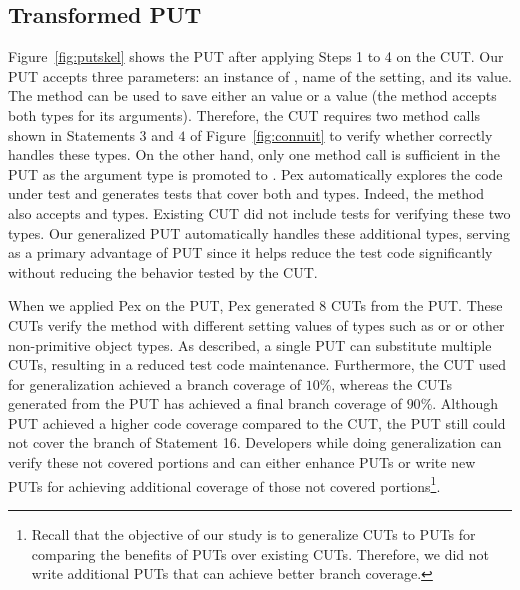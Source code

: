 \subsection{Transformed PUT}

Figure~\ref{fig:putskel} shows the PUT after applying Steps 1 to 4 on the CUT. Our PUT accepts three parameters: an instance of , name of the setting, and its value. The  method can be used to save either an  value or a  value (the method accepts both types for its arguments). Therefore, the CUT requires two method calls shown in Statements $3$ and $4$ of Figure~\ref{fig:connuit} to verify whether  correctly handles these types. On the other hand, only one method call is sufficient in the PUT as the argument type is promoted to . Pex automatically explores the code under test and generates tests that cover both  and  types. Indeed, the  method also accepts  and  types. Existing CUT did not include tests for verifying these two types. Our generalized PUT automatically handles these additional types, serving as a primary advantage of PUT since it helps reduce the test code significantly without reducing the behavior tested by the CUT.

When we applied Pex on the PUT, Pex generated $8$ CUTs from the PUT. These CUTs verify the  method with different setting values of types such as  or  or other non-primitive object types. As described, a single PUT can substitute multiple CUTs, resulting in a reduced test code maintenance. Furthermore, the CUT used for generalization achieved a branch coverage of $10$\%, whereas the CUTs generated from the PUT has achieved a final branch coverage of $90$\%. Although PUT achieved a higher code coverage compared to the CUT, the PUT still could not cover the  branch of Statement 16. Developers while doing generalization can verify these not covered portions and can either enhance PUTs or write new PUTs for achieving additional coverage of those not covered portions\footnote{Recall that the objective of our study is to generalize CUTs to PUTs for comparing the benefits of PUTs over existing CUTs. Therefore, we did not write additional PUTs that can achieve better branch coverage.}. 


